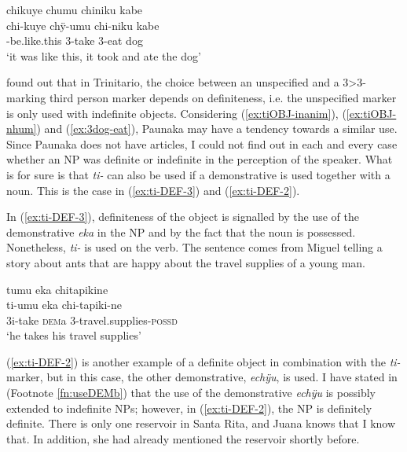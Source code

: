 \ea\label{ex:3dog-eat}
\begingl
\glpreamble chikuye chumu chiniku kabe\\
\gla chi-kuye chÿ-umu chi-niku kabe\\
-be.like.this 3-take 3-eat dog\\
\glft ‘it was like this, it took and ate the dog’
\endgl
\trailingcitation{[jxx-a120516l-a.199]}
\xe{}

\citet[480]{Rose2011a} found out that in Trinitario, the choice between an unspecified and a 3>3-marking third person marker depends on definiteness, i.e. the unspecified marker is only used with indefinite objects. Considering (\ref{ex:tiOBJ-inanim}), (\ref{ex:tiOBJ-nhum}) and (\ref{ex:3dog-eat}), Paunaka may have a tendency towards a similar use. Since Paunaka does not have articles, I could not find out in each and every case whether an NP was definite or indefinite in the perception of the speaker. What is for sure is that \textit{ti-} can also be used if a demonstrative is used together with a noun. This is the case in (\ref{ex:ti-DEF-3}) and (\ref{ex:ti-DEF-2}).

In (\ref{ex:ti-DEF-3}), definiteness of the object is signalled by the use of the demonstrative \textit{eka} in the NP and by the fact that the noun is possessed. Nonetheless, \textit{ti-} is used on the verb. The sentence comes from Miguel telling a story about ants that are happy about the travel supplies of a young man.

\ea\label{ex:ti-DEF-3}
\begingl
\glpreamble tumu eka chitapikine\\
\gla ti-umu eka chi-tapiki-ne\\
\glb 3i-take \textsc{dem}a 3-travel.supplies-\textsc{possd}\\
\glft ‘he takes his travel supplies’
\endgl
{}
\xe


(\ref{ex:ti-DEF-2}) is another example of a definite object in combination with the \textit{ti-} marker, but in this case, the other demonstrative, \textit{echÿu}, is used. I have stated in  (Footnote \ref{fn:useDEMb}) that the use of the demonstrative \textit{echÿu} is possibly extended to indefinite NPs; however, in (\ref{ex:ti-DEF-2}), the NP is definitely definite. There is only one reservoir in Santa Rita, and Juana knows that I know that. In addition, she had already mentioned the reservoir shortly before.

